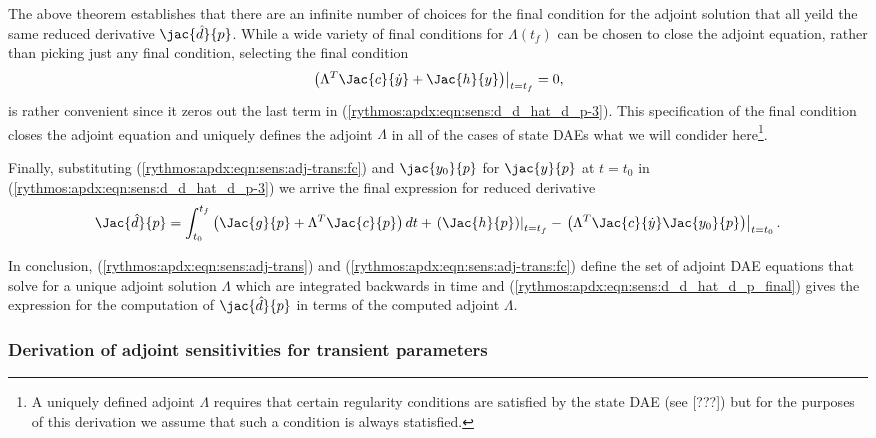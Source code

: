 \documentclass[pdf,ps2pdf,11pt]{SANDreport}
\begin{document}
The above theorem establishes that there are an infinite number of choices for
the final condition for the adjoint solution that all yeild the same reduced
derivative $\jac{\hat{d}}{p}$.  While a wide variety of final conditions for
$\Lambda(t_f)$ can be chosen to close the adjoint equation, rather than
picking just any final condition, selecting the final condition
%
\begin{equation}
\left. \left(
  \Lambda^T \Jac{c}{\dot{y}}
  +  \Jac{h}{y}
\right) \right|_{t=t_f}
 = 0,
\label{rythmos:apdx:eqn:sens:adj-trans:fc}
\end{equation}
%
is rather convenient since it zeros out the last term in
(\ref{rythmos:apdx:eqn:sens:d_d_hat_d_p-3}).  This specification of the final
condition closes the adjoint equation and uniquely defines the adjoint
$\Lambda$ in all of the cases of state DAEs what we will condider
here\footnote{A uniquely defined adjoint $\Lambda$ requires that certain
regularity conditions are satisfied by the state DAE (see [???]) but for the
purposes of this derivation we assume that such a condition is always
statisfied.}.  

Finally, substituting (\ref{rythmos:apdx:eqn:sens:adj-trans:fc}) and
$\jac{y_0}{p}$ for $\jac{y}{p}$ at $t=t_0$ in
(\ref{rythmos:apdx:eqn:sens:d_d_hat_d_p-3}) we arrive the final expression for
reduced derivative
%
\begin{equation}
\Jac{\hat{d}}{p} =
\int_{t_0}^{t_f} \left(
    \Jac{g}{p}
    + \Lambda^T \Jac{c}{p}
  \right) dt
  + \left. \left( \Jac{h}{p} \right) \right|_{t=t_f}
  - \left. \left( \Lambda^T \Jac{c}{\dot{y}} \Jac{y_0}{p} \right) \right|_{t=t_0}.
\label{rythmos:apdx:eqn:sens:d_d_hat_d_p_final}
\end{equation}

In conclusion, (\ref{rythmos:apdx:eqn:sens:adj-trans}) and
(\ref{rythmos:apdx:eqn:sens:adj-trans:fc}) define the set of adjoint DAE
equations that solve for a unique adjoint solution $\Lambda$ which are
integrated backwards in time and
(\ref{rythmos:apdx:eqn:sens:d_d_hat_d_p_final}) gives the expression for the
computation of $\jac{\hat{d}}{p}$ in terms of the computed adjoint $\Lambda$.

\subsubsection{Derivation of adjoint sensitivities for transient parameters}
\end{document}
